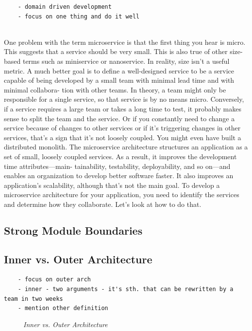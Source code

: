 \documentclass[thesis=M,english,hidelinks]{FITthesis}[2012/10/20]
\begin{document}
\begin{verbatim}
    - domain driven development
    - focus on one thing and do it well
        
\end{verbatim}
    One problem with the term microservice is that the first thing you hear is micro. This suggests that a service should be very small. This is also true of other size-based terms such as miniservice or nanoservice. In reality, size isn’t a useful metric.
A much better goal is to define a well-designed service to be a service capable of being developed by a small team with minimal lead time and with minimal collabora- tion with other teams. In theory, a team might only be responsible for a single service, so that service is by no means micro. Conversely, if a service requires a large team or takes a long time to test, it probably makes sense to split the team and the service. Or if you constantly need to change a service because of changes to other services or if it’s triggering changes in other services, that’s a sign that it’s not loosely coupled. You might even have built a distributed monolith.
The microservice architecture structures an application as a set of small, loosely coupled services. As a result, it improves the development time attributes—main- tainability, testability, deployability, and so on—and enables an organization to develop better software faster. It also improves an application’s scalability, although that’s not the main goal. To develop a microservice architecture for your application, you need to identify the services and determine how they collaborate. Let’s look at how to do that.

\subsection{Strong Module Boundaries}

\subsection{Inner vs. Outer Architecture}
\begin{verbatim}
    - focus on outer arch
    - inner - two arguments - it's sth. that can be rewritten by a team in two weeks
    - mention other definition
\end{verbatim}
\begin{figure}
 \caption{\textit{Inner vs. Outer Architecture}}
 \label{fig:in-vs-out-arch}
\end{figure}
\end{document}
